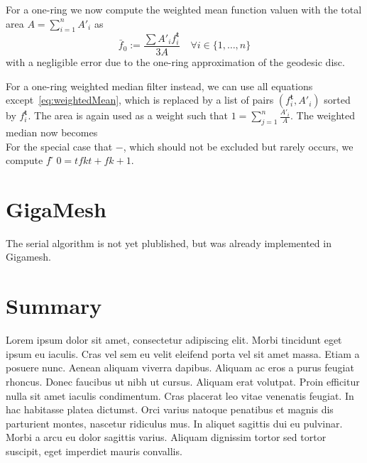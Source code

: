 For a one-ring we now compute the weighted mean function valuen with the total area
$A = \displaystyle\sum_{i=1}^nA'_i$ as
\begin{equation}
	\bar{f}_0 := \frac{\sum A'_if_i^\mathbf{t}}{3A} \quad \forall i \in \{1,\ldots,n\}
	\label{eq:weightedMean}
\end{equation}
with a negligible error due to the one-ring approximation of the geodesic 
disc.

For a one-ring weighted median filter instead, we can use all equations 
except~\ref{eq:weightedMean}, which is replaced by a list of pairs $(f_i^\mathbf{t}, 
A'_i)$ sorted by $f_i^\mathbf{t}$. The area is again used as a weight such that 
$1 = \displaystyle\sum_{j=1}^n\frac{A'_i}{A}$. The weighted median now becomes
\begin{equation}
\end{equation}
For the special case that $-$, which should not be excluded but rarely occurs, 
we compute $f  ̃ 0 =tf k t + f k+1$.~\cite[s.~3.2]{Mara17}



\section{GigaMesh}
The serial algorithm is not yet plublished, but was already implemented in Gigamesh.



\section{Summary}
Lorem ipsum dolor sit amet, consectetur adipiscing elit. Morbi tincidunt eget 
ipsum eu iaculis. Cras vel sem eu velit eleifend porta vel sit amet massa. Etiam 
a posuere nunc. Aenean aliquam viverra dapibus. Aliquam ac eros a purus feugiat 
rhoncus. Donec faucibus ut nibh ut cursus. Aliquam erat volutpat. Proin efficitur 
nulla sit amet iaculis condimentum. Cras placerat leo vitae venenatis feugiat. In 
hac habitasse platea dictumst. Orci varius natoque penatibus et magnis dis 
parturient montes, nascetur ridiculus mus. In aliquet sagittis dui eu pulvinar. 
Morbi a arcu eu dolor sagittis varius. Aliquam dignissim tortor sed tortor 
suscipit, eget imperdiet mauris convallis.
